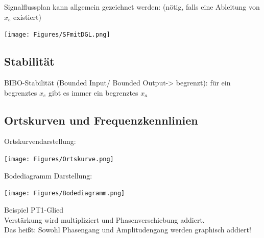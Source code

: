 Signalflussplan kann allgemein gezeichnet werden: (nötig, falls eine Ableitung von $x_e$ existiert)

\texttt{[image: Figures/SFmitDGL.png]}

\subsection{Stabilität}
\begin{mdframed}[style=exercise]
	BIBO-Stabilität (Bounded Input/ Bounded Output-> begrenzt):
	für ein begrenztes $x_e$ gibt es immer ein begrenztes $x_a$
\end{mdframed}


\subsection{Ortskurven und Frequenzkennlinien}
Ortskurvendarstellung:
\begin{center}
	\texttt{[image: Figures/Ortskurve.png]}
\end{center}

\newpage
Bodediagramm Darstellung:
\begin{center}
	\texttt{[image: Figures/Bodediagramm.png]}
\end{center}
\begin{mdframed}[style=exercise]



	Beispiel PT1-Glied\\
	Verstärkung wird multipliziert und Phasenverschiebung addiert.\\ Das
	heißt: Sowohl Phasengang und Amplitudengang werden graphisch addiert!
\end{mdframed}

